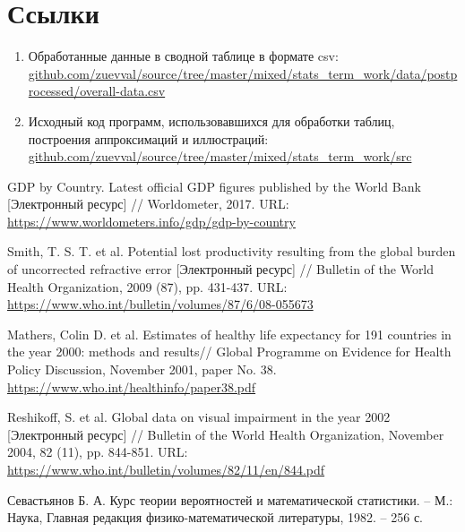 \documentclass[a4paper,12pt]{article} %
\begin{document}

\listoftables
\listoffigures \newpage



\newpage
\section{Ссылки}
\begin{enumerate}
	\item Обработанные данные в сводной таблице в формате csv: \linebreak
	\href{https://github.com/zuevval/source/tree/master/mixed/stats_term_work/data/postprocessed/overall-data.csv}{github.com/zuevval/source/tree/master/mixed/stats\_term\_work/data/\-post\-pro\-ces\-sed/overall-data.csv} \label{link:data}
	
	\item Исходный код программ, использовавшихся для обработки таблиц, построения аппроксимаций и иллюстраций: \linebreak \href{https://github.com/zuevval/source/tree/master/mixed/stats_term_work/src}{github.com/zuevval/source/tree/master/mixed/stats\_term\_work/src} \label{link:source}
\end{enumerate}
\begin{thebibliography}{99}
	 GDP by Country. Latest official GDP figures published by the World Bank [Электронный ресурс] // Worldometer, 2017. URL: \url{https://www.worldometers.info/gdp/gdp-by-country}
	
	 Smith, T. S. T. et al. Potential lost productivity resulting from the global burden of uncorrected refractive error [Электронный ресурс] // Bulletin of the World Health Organization, 2009 (87), pp. 431-437. URL: \url{https://www.who.int/bulletin/volumes/87/6/08-055673}
	
	 Mathers, Colin D. et al. Estimates of healthy life expectancy
	for 191 countries in the year 2000:
	methods and results// Global Programme on Evidence for Health Policy Discussion, November 2001, paper No. 38. \url{https://www.who.int/healthinfo/paper38.pdf}
	
	 Reshikoff, S. et al. Global data on visual impairment in the year 2002 [Электронный ресурс] // Bulletin of the World Health Organization, November 2004, 82 (11), pp. 844-851. URL: \url{https://www.who.int/bulletin/volumes/82/11/en/844.pdf}
	
	 Севастьянов Б. А. Курс теории вероятностей и математической статистики. -- М.: Наука, Главная редакция физико-математической литературы, 1982. -- 256 с.
\end{thebibliography}
\end{document}
